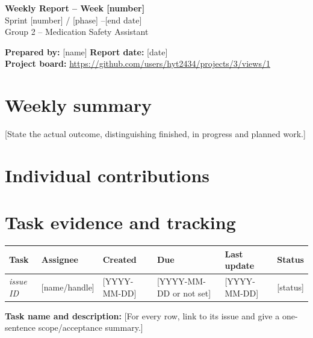 

\begin{center}
{\Large\bfseries Weekly Report -- Week [number]}\\[3pt]
Sprint [number] / [phase] --[end date]\\
Group 2 -- Medication Safety Assistant
\end{center}

\textbf{Prepared by:} [name] \qquad \textbf{Report date:} [date]\\
\textbf{Project board:} \url{https://github.com/users/hyt2434/projects/3/views/1}

\section{Weekly summary}
[State the actual outcome, distinguishing finished, in progress and planned work.]

\section{Individual contributions}

\section{Task evidence and tracking}
\begin{longtable}{p{1.5cm}p{3.1cm}p{2.3cm}p{2.3cm}p{2.3cm}p{2.3cm}}
\toprule
Task & Assignee & Created & Due & Last update & Status \\ \midrule
\textit{issue ID} & [name/handle] & [YYYY-MM-DD] & [YYYY-MM-DD or not set] & [YYYY-MM-DD] & [status] \\ 
\bottomrule
\end{longtable}
\textbf{Task name and description:} [For every row, link to its issue and give a one-sentence scope/acceptance summary.]

